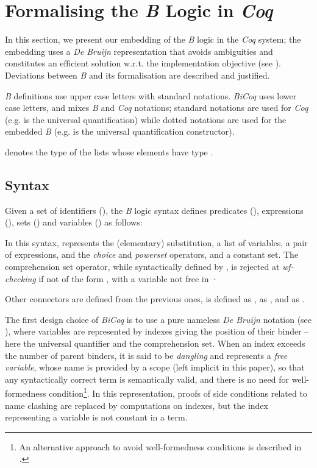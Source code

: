 \documentclass{llncs}
\begin{document}
\section{Formalising the \emph{B} Logic in \emph{Coq}}\label{sc_formal}

In this section, we present our embedding of the \emph{B} logic in the \emph{Coq} system; the 
embedding uses a \emph{De Bruijn} representation that avoids ambiguities and constitutes an 
efficient solution w.r.t. the implementation objective (see \cite{deb:1,lia:1}). Deviations 
between \emph{B} and its formalisation are described and justified.

\begin{notation}\small\emph{B} definitions use upper case letters with standard notations.
\emph{BiCoq} uses lower case letters, and mixes \emph{B} and \emph{Coq} notations; standard 
notations are used for \emph{Coq} (e.g.  is the universal quantification) while 
dotted notations are used for the embedded \emph{B} (e.g.  is the universal
quantification constructor).
\end{notation}

\begin{notation}\small denotes the type of the lists whose elements have type .
\end{notation}

\subsection{Syntax}\label{ss_syntax}

Given a set of identifiers (), the \emph{B} logic syntax defines predicates (), 
expressions (), sets () and variables () as follows:

In this syntax,  represents the (elementary) substitution,  a list 
of variables,  a pair of expressions,  and   
the \emph{choice} and \emph{powerset} operators, and  a constant set. The 
comprehension set operator, while syntactically defined by , is rejected at 
\emph{wf-checking} if not of the form , with  a variable not 
free in ·

\begin{defn}\small Other connectors are defined from the previous ones,
 is defined as , 
 as , and  as 
.
\end{defn}

The first design choice of \emph{BiCoq} is to use a pure nameless \emph{De Bruijn} notation
(see \cite{deb:1,ayd:1}), where variables are represented by indexes giving the position of 
their binder -- here the universal quantifier and the comprehension set. When an index exceeds 
the number of parent binders, it is said to be \emph{dangling} and represents a
\emph{free variable}, whose name is provided by a scope (left implicit in this paper), so that 
any syntactically correct term is semantically valid, and there is no need for well-formedness 
condition\footnote{An alternative approach to avoid well-formedness conditions is described in 
\cite{pat:1}.}. In this representation, proofs of side conditions related to name clashing are 
replaced by computations on indexes, but the index representing a variable is not constant in 
a term.
\end{document}
